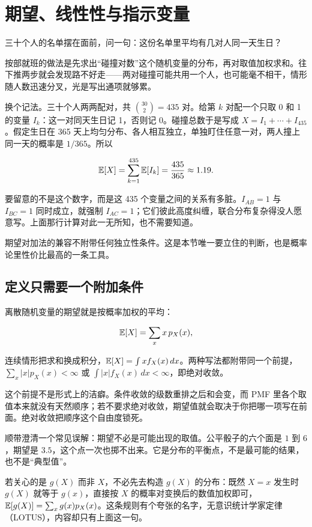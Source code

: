 \section{期望、线性性与指示变量}
\label{sec:05-Probability/04-Expectation-and-Moments/01}

三十个人的名单摆在面前，问一句：这份名单里平均有几对人同一天生日？

按部就班的做法是先求出``碰撞对数''这个随机变量的分布，再对取值加权求和。往下推两步就会发现路不好走——两对碰撞可能共用一个人，也可能毫不相干，情形随人数迅速分叉，光是写出通项就够累。

换个记法。三十个人两两配对，共 \(\binom{30}{2}=435\) 对。给第 \(k\) 对配一个只取 0 和 1 的变量 \(I_k\)：这一对同天生日记 1，否则记 0。碰撞总数于是写成 \(X=I_1+\cdots+I_{435}\)。假定生日在 365 天上均匀分布、各人相互独立，单独盯住任意一对，两人撞上同一天的概率是 \(1/365\)。所以

\[
\mathbb{E}[X]=\sum_{k=1}^{435}\mathbb{E}[I_k]=\frac{435}{365}\approx1.19.
\]

要留意的不是这个数字，而是这 435 个变量之间的关系有多脏。\(I_{AB}=1\) 与 \(I_{BC}=1\) 同时成立，就强制 \(I_{AC}=1\)；它们彼此高度纠缠，联合分布复杂得没人愿意写。上面那行计算对此一无所知，也不需要知道。

期望对加法的兼容不附带任何独立性条件。这是本节唯一要立住的判断，也是概率论里性价比最高的一条工具。

\subsection{定义只需要一个附加条件}

离散随机变量的期望就是按概率加权的平均：

\[
\mathbb{E}[X]=\sum_x x\,p_X(x),
\]

连续情形把求和换成积分，\(\mathbb{E}[X]=\int x f_X(x)\,dx\)。两种写法都附带同一个前提，\(\sum_x|x|p_X(x)<\infty\) 或 \(\int|x|f_X(x)\,dx<\infty\)，即绝对收敛。

这个前提不是形式上的洁癖。条件收敛的级数重排之后和会变，而 PMF 里各个取值本来就没有天然顺序；若不要求绝对收敛，期望值就会取决于你把哪一项写在前面。绝对收敛把顺序这个自由度锁死。

顺带澄清一个常见误解：期望不必是可能出现的取值。公平骰子的六个面是 \(1\) 到 \(6\)，期望是 \(3.5\)，这个点一次也掷不出来。它是分布的平衡点，不是最可能的结果，也不是``典型值''。

若关心的是 \(g(X)\) 而非 \(X\)，不必先去构造 \(g(X)\) 的分布：既然 \(X=x\) 发生时 \(g(X)\) 就等于 \(g(x)\)，直接按 \(X\) 的概率对变换后的数值加权即可，\(\mathbb{E}[g(X)]=\sum_x g(x)p_X(x)\)。这条规则有个夸张的名字，无意识统计学家定律（LOTUS），内容却只有上面这一句。

